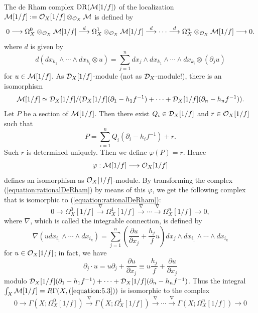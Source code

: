 \documentclass[12pt]{article}
\def\Dsc{ {\cal D} }
\def\Msc{ {\cal M} }
\def\Osc{ {\cal O} }
\begin{document}
The de Rham complex ${\rm DR}(\Msc[1/f])$ of the localization 
$\Msc[1/f] := \Osc_X[1/f]\otimes_{\Osc_X}\Msc$ is defined by
\begin{equation}
\label{equation:rationalDeRham}
0 \longrightarrow \Omega_X^{0}\otimes_{\Osc_X}\Msc[1/f]
\stackrel{d}{\longrightarrow} \Omega_X^{1}\otimes_{\Osc_X}\Msc[1/f] 
\stackrel{d}{\longrightarrow}
\cdots
\stackrel{d}{\longrightarrow} \Omega_X^{n}\otimes_{\Osc_X}\Msc[1/f]
\longrightarrow 0.
\end{equation}
where $d$ is given by
$$
d(dx_{k_1}\wedge \cdots \wedge dx_{k_i}\otimes u)
= \sum_{j=1}^n dx_j\wedge dx_{k_1}\wedge \cdots \wedge dx_{k_i}
\otimes (\partial_j u)
$$
for $u \in \Msc[1/f]$. 
As $\Dsc_X[1/f]$-module (not as $\Dsc_X$-module!), 
there is an isomorphism 
$$ 
\Msc[1/f] \simeq \Dsc_X[1/f]/
(\Dsc_X[1/f](\partial_1 - h_1f^{-1}) + \dots 
+ \Dsc_X[1/f](\partial_n -h_nf^{-1})).
$$
Let $P$ be a section of $\Msc[1/f]$.  Then there exist $Q_i\in\Dsc_X[1/f]$
and $r \in \Osc_X[1/f]$ such that
$$
P = \sum_{i=1}^n Q_i(\partial_i - h_if^{-1}) + r.
$$
Such $r$ is determined uniquely. 
Then we define $\varphi(P) = r$.
Hence
$$ 
\varphi : \Msc[1/f] \longrightarrow \Osc_X[1/f]
$$
defines an isomorphism as $\Osc_X[1/f]$-module.  
By transforming the complex (\ref{equation:rationalDeRham}) by means of this $\varphi$, we get
the following complex that is isomorphic to (\ref{equation:rationalDeRham}):
\begin{equation}
\label{equation:5.3}
0 \longrightarrow \Omega_X^{0}[1/f]
\stackrel{\nabla}{\longrightarrow} \Omega_X^{1}[1/f] 
\stackrel{\nabla}{\longrightarrow}
\cdots
\stackrel{\nabla}{\longrightarrow} \Omega_X^{n}[1/f]
\longrightarrow 0,
\end{equation}
where $\nabla$, which is called the integrable connection,
is defined by 
$$
\nabla(u dx_{i_1}\wedge \cdots \wedge dx_{i_k})
= \sum_{j=1}^n \left(\frac{\partial u}{\partial x_j}+\frac{h_j}{f}u\right) 
dx_j\wedge dx_{i_1}\wedge \cdots \wedge dx_{i_k}
$$
for $u \in \Osc_X[1/f]$; in fact, we have 
$$
\partial_j\cdot u = u\partial_j + \frac{\partial u}{\partial x_j} 
\equiv u\frac{h_j}{f} + \frac{\partial u}{\partial x_j} 
$$
modulo $\Dsc_X[1/f](\partial_1-h_1f^{-1}) +\dots+ 
\Dsc_X[1/f](\partial_n-h_nf^{-1})$.
Thus the integral $\int_X \Msc[1/f] = R\Gamma(X, (\ref{equation:5.3}))$ 
is isomorphic to the complex
\begin{equation} \label{equation:rationalNablaComplex}
0 \longrightarrow \Gamma(X;\Omega_X^{0}[1/f])
\stackrel{\nabla}{\longrightarrow} \Gamma(X;\Omega_X^{1}[1/f]) 
\stackrel{\nabla}{\longrightarrow}
\cdots
\stackrel{\nabla}{\longrightarrow} \Gamma(X;\Omega_X^{n}[1/f])
\longrightarrow 0
\end{equation}
\end{document}
